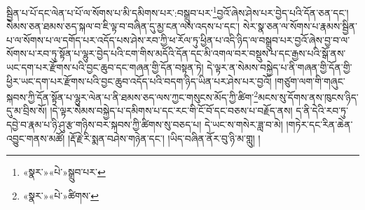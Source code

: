 སྦྱིན་པ་པོ་དང་ལེན་པ་པོ་ལ་སོགས་པ་མི་དམིགས་པར་:བསྒྲུབ་པར་\footnote{«སྣར་»«པེ་»སྒྲུབ་པར་}བྱའོ་ཞེས་ཤེས་པར་བྱེད་པའི་དོན་ཅན་དང་། སེམས་ཅན་ཐམས་ཅད་སྐལ་བ་ཇི་ལྟ་བ་བཞིན་དུ་མྱ་ངན་ལས་འདས་པ་དང་། སེར་སྣ་ཅན་ལ་སོགས་པ་རྣམས་སྦྱིན་པ་ལ་སོགས་པ་ལ་དགོད་པར་འདོད་པས་ཤེས་རབ་ཀྱི་ཕ་རོལ་ཏུ་ཕྱིན་པ་འདི་ཉིད་ལ་བསྒྲུབ་པར་བྱའོ་ཞེས་བྱ་བ་ལ་སོགས་པ་རབ་ཏུ་སྟོན་པ་ལྷུར་བྱེད་པའི་ངག་གིས་མདོའི་དོན་དང་མི་འགལ་བར་བསྡུས་པ་དང་རྒྱས་པའི་སྒོ་ནས་ཡང་དག་པར་རྫོགས་པའི་བྱང་ཆུབ་དང་གཞན་གྱི་དོན་བསྟན་ཏེ། དེ་ལྟར་ན་སེམས་བསྐྱེད་པ་ནི་གཞན་གྱི་དོན་གྱི་ཕྱིར་ཡང་དག་པར་རྫོགས་པའི་བྱང་ཆུབ་འདོད་པའི་བདག་ཉིད་ཡིན་པར་ཤེས་པར་བྱའོ། །གཙུག་ལག་གི་གཞུང་སྐབས་ཀྱི་དོན་སྟོན་པ་ལྷུར་ལེན་པ་ནི་ཐམས་ཅད་ལས་ཀྱང་གསུངས་མོད་ཀྱི་ཚིག་\footnote{«སྣར་»«པེ་»ཚིགས་}མངས་སུ་དོགས་ནས་ཁུངས་ཉིད་དུ་མ་བྲིས་སོ། །དེ་ལྟར་སེམས་བསྐྱེད་པ་དམིགས་པ་དང་རང་གི་ངོ་བོ་དང་བཅས་པ་བརྗོད་ནས། ད་ནི་དེའི་རབ་ཏུ་དབྱེ་བ་རྣམ་པ་ཉི་ཤུ་རྩ་གཉིས་བར་སྐབས་ཀྱི་ཚིགས་སུ་བཅད་པ། དེ་ཡང་ས་གསེར་ཟླ་བ་མེ། །གཏེར་དང་རིན་ཆེན་འབྱུང་གནས་མཚོ། །རྡོ་རྗེ་རི་སྨན་བཤེས་གཉེན་དང་། །ཡིད་བཞིན་ནོར་བུ་ཉི་མ་གླུ། །
